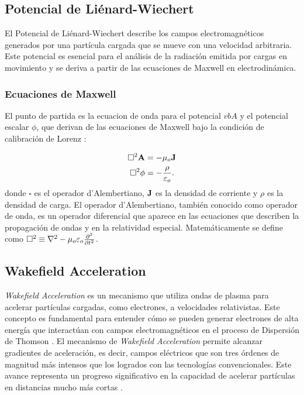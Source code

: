 \subsection{Potencial de Liénard-Wiechert}
El Potencial de Liénard-Wiechert describe los campos electromagnéticos generados por una partícula cargada que se mueve con una velocidad arbitraria. Este potencial es esencial para el análisis de la radiación emitida por cargas en movimiento y se deriva a partir de las ecuaciones de Maxwell en electrodinámica.

\subsubsection{Ecuaciones de Maxwell}
El punto de partida es la ecuacion de onda para el potencial $vb{A}$ y el potencial escalar $\phi$, que derivan de las ecuaciones de Maxwell bajo la condición de calibración de Lorenz \cite{griffiths2021introduction}:

\begin{align}
    \square ^2 \vb{A} &= -\mu _o \vb{J} \label{vectorPotential} \\
    \square ^2 \phi &= -\frac{\rho}{\varepsilon _o}. \label{scalarPotential}
\end{align}
donde $\square$ es el operador d'Alembertiano, $\vb{J}$ es la densidad de corriente y $\rho$ es la densidad de carga. El operador d'Alembertiano, también conocido como operador de onda, es un operador diferencial que aparece en las ecuaciones que describen la propagación de ondas y en la relatividad especial. Matemáticamente se define como $\square ^2 \equiv \laplacian - \mu _o \varepsilon _o \pdv[2]{t}$.


\subsection{Wakefield Acceleration}

\emph{Wakefield Acceleration} es un mecanismo que utiliza ondas de plasma para acelerar partículas cargadas, como electrones, a velocidades relativistas. Este concepto es fundamental para entender cómo se pueden generar electrones de alta energía que interactúan con campos electromagnéticos en el proceso de Dispersión de Thomson \cite{albert2023principles}. El mecanismo de \emph{Wakefield Acceleration} permite alcanzar gradientes de aceleración, es decir, campos eléctricos que son tres órdenes de magnitud más intensos que los logrados con las tecnologías convencionales. Este avance representa un progreso significativo en la capacidad de acelerar partículas en distancias mucho más cortas \cite{chen1984introduction}.

